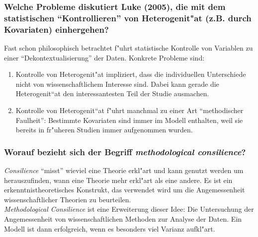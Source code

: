 \subsubsection{Welche Probleme diskutiert Luke (2005), die mit dem statistischen ``Kontrollieren'' von Heterogenit"at (z.B. durch Kovariaten) einhergehen?}
Fast schon philosophisch betrachtet f"uhrt statistische Kontrolle von Variablen zu einer ``Dekontextualisierung'' der Daten. Konkrete Probleme sind:
\begin{enumerate}
  \item Kontrolle von Heterogenit"at impliziert, dass die individuellen Unterschiede nicht von wissenschaftlichem Interesse sind. Dabei kann gerade die Heterogenit“at den interessantesten Teil der Studie ausmachen.
  \item Kontrolle von Heterogenit“at f"uhrt manchmal zu einer Art ``methodischer Faulheit'': Bestimmte Kovariaten sind immer im Modell enthalten, weil sie bereits in fr"uheren Studien immer aufgenommen wurden.
\end{enumerate}

\subsubsection{Worauf bezieht sich der Begriff  \emph{methodological consilience}?}
\emph{Consilience} ``misst'' wieviel eine Theorie erkl"art und kann genutzt werden um herauszufinden, wann eine Theorie mehr erkl"art als eine andere. Es ist ein erkenntnistheoretisches Konstrukt, das verwendet wird um die Angemessenheit wissenschaftlicher Theorien zu beurteilen.\\
\emph{Methodological Consilience} ist eine Erweiterung dieser Idee: Die Untersuchung der Angemessenheit von wissenschaftlichen Methoden zur Analyse der Daten. Ein Modell ist dann erfolgreich, wenn es besonders viel Varianz aufkl"art.
